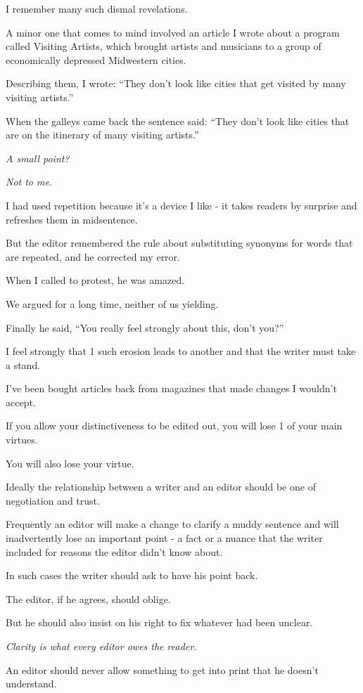 \documentclass{book}
\numberwithin{equation}{section}
\begin{document}
%
I remember many such dismal revelations.

A minor one that comes to mind involved an article I wrote about a program called Visiting Artists, which brought artists and musicians to a group of economically depressed Midwestern cities.

Describing them, I wrote: ``They don't look like cities that get visited by many visiting artists.''

When the galleys came back the sentence said: ``They don't look like cities that are on the itinerary of many visiting artists.''

\textit{A small point?}

\textit{Not to me}.

I had used repetition because it's a device I like - it takes readers by surprise and refreshes them in midsentence.

But the editor remembered the rule about substituting synonyms for words that are repeated, and he corrected my error.

When I called to protest, he was amazed.

We argued for a long time, neither of us yielding.

Finally he said, ``You really feel strongly about this, don't you?''

I feel strongly that 1 such erosion leads to another and that the writer must take a stand.

I've been bought articles back from magazines that made changes I wouldn't accept.

If you allow your distinctiveness to be edited out, you will lose 1 of your main virtues.

You will also lose your virtue.

%
Ideally the relationship between a writer and an editor should be one of negotiation and trust.

Frequently an editor will make a change to clarify a muddy sentence and will inadvertently lose an important point - a fact or a nuance that the writer included for reasons the editor didn't know about.

In such cases the writer should ask to have his point back.

The editor, if he agrees, should oblige.

But he should also insist on his right to fix whatever had been unclear.

\textit{Clarity is what every editor owes the reader}.

An editor should never allow something to get into print that he doesn't understand.
\end{document}
